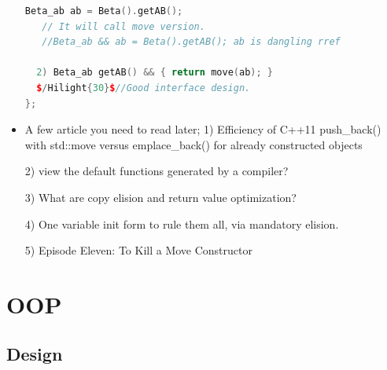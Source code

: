 \documentclass[a4paper,12pt,twoside]{book}
\begin{document}
\begin{itemize}
\begin{lstlisting}[frame=single, language=c++]
   Beta_ab ab = Beta().getAB();
   // It will call move version.
   //Beta_ab && ab = Beta().getAB(); ab is dangling rref

  2) Beta_ab getAB() && { return move(ab); }
  $/Hilight{30}$//Good interface design.
};
\end{lstlisting}

\item A few article you need to read later;
1) Efficiency of C++11 push\_back() with std::move versus emplace\_back() for already constructed objects

2) view the default functions generated by a compiler?

3) What are copy elision and return value optimization?

4) One variable init form to rule them all, via mandatory elision.

5) Episode Eleven: To Kill a Move Constructor

\end{itemize}


\section{OOP}
\subsection{Design}
\end{document}
